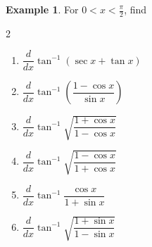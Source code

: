\documentclass[../../main.tex]{subfiles}
\theoremstyle{definition}
\newtheorem{example}{Example}[section]
\begin{document}
\begin{example}
For  $ 0 < x <\frac{\pi}{2}$, find 
\begin{multicols}{2}
\begin{enumerate}[label=(\roman*)]
    \item $\dfrac{d}{dx} \tan ^{-1} (\sec x+\tan x)$
    \item $\dfrac{d}{dx} \tan ^{-1} (\dfrac{1-\cos x}{\sin x})$
    \item $\dfrac{d}{dx} \tan ^{-1} \sqrt{\dfrac{1+\cos x}{1-\cos x}}$ 
    \item $\dfrac{d}{dx} \tan ^{-1} \sqrt{\dfrac{1-\cos x}{1+\cos x}}$
    \item $\dfrac{d}{dx} \tan^{-1} \dfrac{\cos x}{1+\sin x}$
    \item $\dfrac{d}{dx} \tan ^{-1} \sqrt{\dfrac{1+\sin x}{1-\sin x}}$
\end{enumerate}
\end{multicols}
\end{example}
\end{document}
